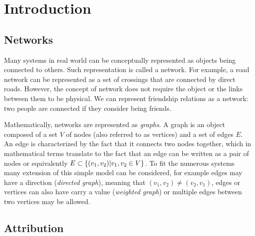 \documentclass[
11pt, %
english, %
singlespacing, %
liststotoc, %
headsepline, %
]{MastersDoctoralThesis} %
\begin{document}

\mainmatter %

\pagestyle{thesis} %

\listoftodos

\chapter{Introduction}

\section{Networks}

Many systems in real world can be conceptually represented as objects being connected to others. Such representation is called a network. For example, a road network can be represented as a set of crossings that are connected by direct roads. However, the concept of network does not require the object or the links between them to be physical. We can represent friendship relations as a network: two people are connected if they consider being friends.

Mathematically, networks are represented as \emph{graphs}. A graph is an object composed of a set $V$ of nodes (also referred to as vertices) and a set of edges $E$. An edge is characterized by the fact that it connects two nodes together, which in mathematical terms translate to the fact that an edge can be written as a pair of nodes or equivalently $E \subset \{(v_1, v_2) | v_1, v_2 \in V \}$. To fit the numerous systems many extension of this simple model can be considered, for example edges may have a direction (\emph{directed graph}), meaning that $(v_1, v_2) \neq (v_2, v_1)$, edges or vertices can also have carry a value (\emph{weighted graph}) or multiple edges between two vertices may be allowed.

\section{Attribution}

\end{document}
